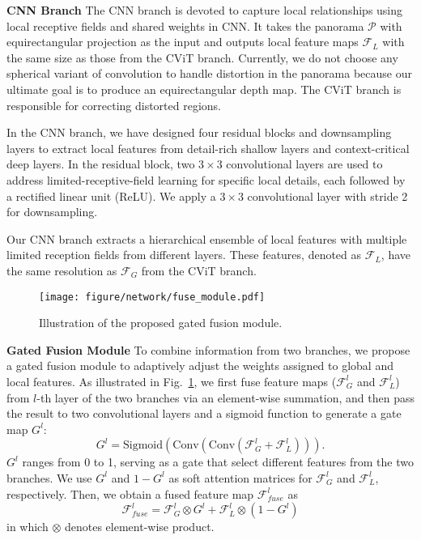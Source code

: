\documentclass[10pt,twocolumn,letterpaper]{article}
\begin{document}
\textbf{CNN Branch }
The CNN branch is devoted to capture local relationships using local receptive fields and shared weights in CNN. It takes the panorama $\mathcal{P}$ with equirectangular projection as the input and outputs local feature maps $\mathcal{F}_{L}$ with the same size as those from the CViT branch. Currently, we do not choose any spherical variant of convolution to handle distortion in the panorama because our ultimate goal is to produce an equirectangular depth map. The CViT branch is responsible for correcting distorted regions.

In the CNN branch, we have designed four residual blocks\cite{He_2016_CVPR} and downsampling layers to extract local features from detail-rich shallow layers and context-critical deep layers. In the residual block, two $3\times 3$ convolutional layers are used to address limited-receptive-field learning for specific local details, each followed by a rectified linear unit (ReLU). We apply a $3\times 3$ convolutional layer with stride 2 for downsampling.

Our CNN branch extracts a hierarchical ensemble of local features with multiple limited reception fields from different layers. These features, denoted as $\mathcal{F}_{L}$, have the same resolution as $\mathcal{F}_{G}$ from the CViT branch.


\begin{figure}[t]
  \centering
   \texttt{[image: figure/network/fuse\_module.pdf]}
   \caption{Illustration of the proposed gated fusion module. 
}
   \label{fig:fuse_module}
\end{figure}

\textbf{Gated Fusion Module }
To combine information from two branches, we propose a gated fusion module to adaptively adjust the weights assigned to global and local features. As illustrated in Fig.~\ref{fig:fuse_module}, we first fuse feature maps ($\mathcal{F}^l_{G}$ and  $\mathcal{F}^l_{L}$) from $l$-th layer of the two branches via an element-wise summation, and then pass the result to two convolutional layers and a sigmoid function to generate a gate map $G^l$:
\begin{equation}
G^l = \text{Sigmoid}(\text{Conv}(\text{Conv}(\mathcal{F}^l_{G} +  \mathcal{F}^l_{L}))).
\end{equation}
$G^l$ ranges from 0 to 1, serving as a gate that select different features from the two branches. We use $G^l$ and $1-G^l$ as soft attention matrices for $\mathcal{F}_{G}^l$ and $ \mathcal{F}_{L}^l$, respectively. Then, we obtain a fused feature map $\mathcal{F}_{fuse}^l$ as
\begin{equation}
\mathcal{F}^l_{fuse} = \mathcal{F}^l_{G}\otimes G^l + \mathcal{F}^l_{L} \otimes(1-G^l)
\end{equation}
in which $\otimes$ denotes element-wise product.
\end{document}
